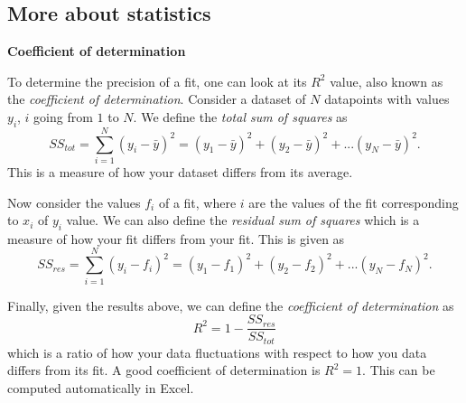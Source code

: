 \documentclass[12pt]{report}
\begin{document}
\begin{appendix}
\chapter{More about statistics}

\noindent \large \textbf{Coefficient of determination} \normalsize

To determine the precision of a fit, one can look at its $R^2$ value, also known as the \textit{coefficient of determination}. Consider a dataset of $N$ datapoints with values $y_i$, $i$ going from $1$ to $N$. We define the \textit{total sum of squares} as
\begin{equation}
SS_{tot} = \displaystyle \sum_{i=1}^N (y_i - \bar{y})^2 = (y_1 - \bar{y})^2 + (y_2 - \bar{y})^2 + ... (y_N - \bar{y})^2.
\end{equation}
This is a measure of how your dataset differs from its average.

Now consider the values $f_i$ of a fit, where $i$ are the values of the fit corresponding to $x_i$ of $y_i$ value. We can also define the \textit{residual sum of squares} which is a measure of how your fit differs from your fit. This is given as
\begin{equation}
SS_{res} = \displaystyle \sum_{i=1}^{N} (y_i - f_i)^2 = (y_1 - f_1)^2 + (y_2 - f_2)^2 + ... (y_N - f_N)^2.
\end{equation}

Finally, given the results above, we can define the \textit{coefficient of determination} as
\begin{equation}
R^2 = 1 - \frac{SS_{res}}{SS_{tot}}
\end{equation}
which is a ratio of how your data fluctuations with respect to how you data differs from its fit. A good coefficient of determination is $R^2=1$. This can be computed automatically in Excel.


\end{appendix}

%
%
\end{document}
